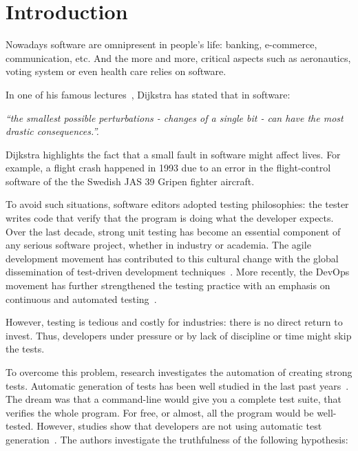 \chapter{Introduction}
\label{chap:introduction}

\minitoc

\graphicspath{{.}{chapitres/introduction/}}

Nowadays software are omnipresent in people's life: banking, e-commerce, communication, etc. 
And the more and more, critical aspects such as aeronautics, voting system or even health care relies on software.

In one of his famous lectures~\cite{DijkstraLecture1989}, Dijkstra has stated that in software: 
\begin{center}
	\emph{``the smallest possible perturbations - \ie changes of a single bit - can have the most drastic consequences.''.}
\end{center}

Dijkstra highlights the fact that a small fault in software might affect lives.
For example, a flight crash happened in 1993 due to an error in the flight-control software of the the Swedish JAS 39 Gripen fighter aircraft.

To avoid such situations, software editors adopted testing philosophies:  the tester writes code that verify that the program is doing what the developer expects.
Over the last decade, strong unit testing has become an essential component of any serious software project, whether in industry or academia.
The agile development movement has contributed to this cultural change with the global dissemination of test-driven development techniques~\cite{beck2003test}.
More recently, the DevOps movement has further strengthened the testing practice with an emphasis on continuous and automated testing~\cite{Roche2013Devops}.

However, testing is tedious and costly for industries: there is no direct return to invest.
Thus, developers under pressure or by lack of discipline or time might skip the tests.

To overcome this problem, research investigates the automation of creating strong tests.
Automatic generation of tests has been well studied in the last past years~\cite{ESECFSE11, PachecoE2005}.
The dream was that a command-line would give you a complete test suite, that verifies the whole program.
For free, or almost, all the program would be well-tested.
However, studies show that developers are not using automatic test generation~\cite{TOSEM_userstudy}.
The authors investigate the truthfulness of the following hypothesis:

